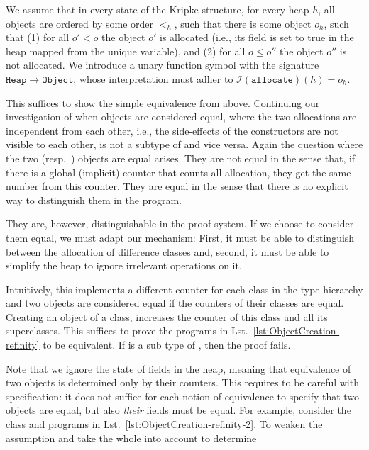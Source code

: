 \begin{definition}
We assume that in every state of the Kripke structure, for every heap $h$, all objects are ordered by some order $<_h$, such that there is some
object $o_h$, such that (1) for all $o' < o$ the object $o'$ is allocated (i.e., its  field is set to true in the heap mapped from the unique  variable), and
(2) for all $o \leq o''$ the object $o''$ is not allocated. 
We introduce a unary function symbol  with the signature $\mathtt{Heap} \rightarrow \mathtt{Object}$,
whose interpretation must adher to $\mathcal{I}(\mathtt{allocate})(h) = o_h$.
\end{definition}

This suffices to show the simple equivalence from above. Continuing our investigation of when objects are considered equal, 
where the two allocations are independent from each other, i.e., the side-effects of the constructors are not visible to each other,  is not a subtype of  and vice versa. Again the question where the two  (resp.\ ) objects are equal arises. They are not equal in the sense that, if there is a global (implicit) counter
that counts all allocation, they get the same number from this counter. They are equal in the sense that there is no explicit way to distinguish them in the program.

They are, however, distinguishable in the proof system. If we choose to consider them equal, we must adapt our  mechanism:
First, it must be able to distinguish between the allocation of difference classes and, second, it must be able to simplify the heap to ignore irrelevant operations on it.
\begin{definition}
\end{definition}
Intuitively, this implements a different counter for each class in the type hierarchy and two objects are considered equal if the counters of their classes are equal.
Creating an object of a class, increases the counter of this class and all its superclasses.
This suffices to prove the programs in Lst.~\ref{lst:ObjectCreation-refinity} to be equivalent. If  is a sub type of , then the proof fails.

Note that we ignore the state of fields in the heap, meaning that equivalence of two objects is determined only by their counters. 
This requires to be careful with specification: it does not suffice for each notion of equivalence to specify that two objects are equal, but also \emph{their} fields must be equal.
For example, consider the class and programs in Lst.~\ref{lst:ObjectCreation-refinity-2}. To weaken the assumption and take the whole into account to determine  

